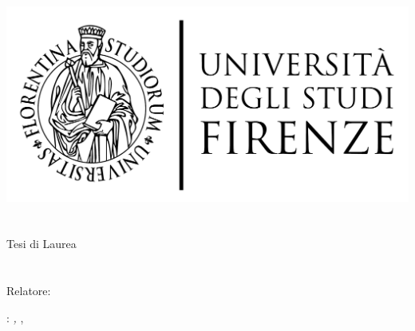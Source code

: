 \begin{titlepage}
	\begin{center}
   	\large
      \hfill
      \vfill
      \begingroup
         \includegraphics[scale=0.15]{logo/LOGO}\\
			\myFaculty \\
			\myDegree \\
			\vspace{0.5cm}
         \vspace{0.5cm}
         Tesi di Laurea
      \endgroup
      \vfill
      \begingroup
      	\color{Maroon}\spacedallcaps{\myItalianTitle} \\ $\ $\\
      	\spacedallcaps{\myEnglishTitle} \\
	\bigskip
      \endgroup
      \spacedlowsmallcaps{\myName}
      \vfill
      \vfill
      Relatore: \emph{\myProf}\\
      \vfill
      \vfill
      \myTime
      \vfill
	\end{center}
\end{titlepage}
   \newpage
	\thispagestyle{empty}
	\hfill
	\vfill
	\noindent\myName:
	\textit{\myItalianTitle,}
	\myDegree, \textcopyright\ \myTime
